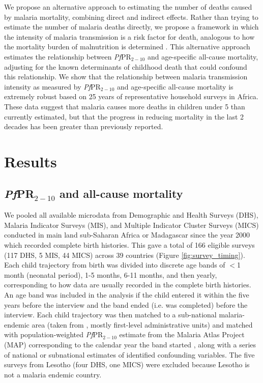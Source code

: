 \documentclass[12pt]{article}
\begin{document}
We propose an alternative approach to estimating the number of deaths caused by malaria mortality, combining direct and indirect effects. Rather than trying to estimate the number of malaria deaths directly, we propose a framework in which the intensity of malaria transmission is a risk factor for death, analogous to how the mortality burden of malnutrition is determined \cite{ritchie:24}. This alternative approach estimates the relationship between \textit{Pf}PR$_{2-10}$ and age-specific all-cause mortality, adjusting for the known determinants of childhood death that could confound this relationship. We show that the relationship between malaria transmission intensity as measured by \textit{Pf}PR$_{2-10}$ and age-specific all-cause mortality is extremely robust based on 25 years of representative household surveys in Africa. These data suggest that malaria causes more deaths in children under 5 than currently estimated, but that the progress in reducing mortality in the last 2 decades has been greater than previously reported.


\section*{Results}
\subsection*{\textit{Pf}PR$_{2-10}$ and all-cause mortality}

We pooled all available microdata from Demographic and Health Surveys (DHS), Malaria Indicator Surveys (MIS), and Multiple Indicator Cluster Surveys (MICS) conducted in main land sub-Saharan Africa or Madagascar since the year 2000 which recorded complete birth histories. This gave a total of 166 eligible surveys (117 DHS, 5 MIS, 44 MICS) across 39 countries (Figure \ref{fig:survey_timing}). Each child trajectory from birth was divided into discrete age bands of $<$1 month (neonatal period), 1-5 months, 6-11 months, and then yearly, corresponding to how data are usually recorded in the complete birth histories. An age band was included in the analysis if the child entered it within the five years before the interview and the band ended (i.e. was completed) before the interview. Each child trajectory was then matched to a sub-national malaria-endemic area (taken from \cite{snow:17}, mostly first-level administrative units) and matched with population-weighted \textit{Pf}PR$_{2-10}$ estimate from the Malaria Atlas Project (MAP) corresponding to the calendar year the band started \cite{map2025}, along with a series of national or subnational estimates of identified confounding variables. The five surveys from Lesotho (four DHS, one MICS) were excluded because Lesotho is not a malaria endemic country. 
\end{document}
